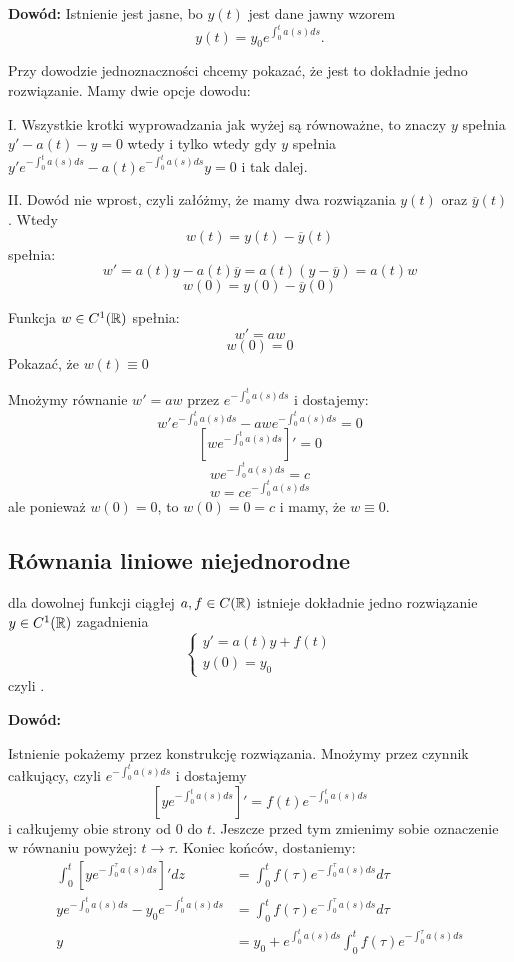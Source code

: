\textbf{Dowód:} Istnienie jest jasne, bo $y(t)$ jest dane jawny wzorem
$$y(t)=y_0e^{\int_0^ta(s)ds}.$$

Przy dowodzie jednoznaczności chcemy pokazać, że jest to dokładnie jedno rozwiązanie. Mamy dwie opcje dowodu:

\indent I. Wszystkie krotki wyprowadzania jak wyżej są równoważne, to znaczy $y$ spełnia $y'-a(t)-y=0$ wtedy i tylko wtedy gdy $y$ spełnia $y'e^{-\int_0^ta(s)ds}-a(t)e^{-\int_0^ta(s)ds}y=0$ i tak dalej.

\indent II. Dowód nie wprost, czyli załóżmy, że mamy dwa rozwiązania $y(t)$ oraz $\overline y(t)$. Wtedy
$$w(t)=y(t)-\overline y(t)$$
spełnia:
$$w'=a(t)y-a(t)\overline y=a(t)(y-\overline y)=a(t)w$$
$$w(0)=y(0)-\overline y(0)$$

Funkcja $w\in C^1(\mathbb{R})$ spełnia:
$$w'=aw$$
$$w(0)=0$$
Pokazać, że $w(t)\equiv 0$

Mnożymy równanie $w'=aw$ przez $e^{-\int_0^ta(s)ds}$ i dostajemy:
$$w'e^{-\int_0^ta(s)ds}-awe^{-\int_0^ta(s)ds}=0$$
$$\left[we^{-\int_0^ta(s)ds}\right]'=0$$
$$we^{-\int_0^ta(s)ds}=c$$
$$w=ce^{-\int_0^ta(s)ds}$$
ale ponieważ $w(0)=0$, to $w(0)=0=c$ i mamy, że $w\equiv 0$.

\subsection{Równania liniowe niejednorodne}

 dla dowolnej funkcji ciągłej $a,f\in C(\mathbb{R})$ istnieje dokładnie jedno rozwiązanie $y\in C^1(\mathbb{R})$ zagadnienia
$$\begin{cases}
    y'=a(t)y+f(t)\\
    y(0)=y_0
\end{cases}$$
czyli .

\textbf{Dowód:}

Istnienie pokażemy przez konstrukcję rozwiązania. Mnożymy przez czynnik całkujący, czyli $e^{-\int_0^ta(s)ds}$ i dostajemy
$$\left[ye^{-\int_0^ta(s)ds}\right]'=f(t)e^{-\int_0^ta(s)ds}$$
i całkujemy obie strony od $0$ do $t$. Jeszcze przed tym zmienimy sobie oznaczenie w równaniu powyżej: $t\to \tau$. Koniec końców, dostaniemy:
\begin{align*}
    \int_0^t\left[ye^{-\int_0^\tau a(s)ds}\right]'dz&=\int_0^tf(\tau)e^{-\int_0^\tau a(s)ds}d\tau\\
    ye^{-\int_0^ta(s)ds}-y_0e^{-\int_0^ta(s)ds}&=\int_0^tf(\tau)e^{-\int_0^\tau a(s)ds}d\tau\\
    y&=y_0+  e^{\int_0^ta(s)ds}\int_0^tf(\tau)e^{-\int_0^\tau a(s)ds}
\end{align*}

